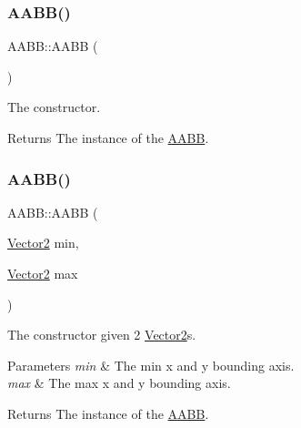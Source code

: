 \mbox{\label{class_a_a_b_b_a5f5baf6c533905aa1456b3a3eb57bab2}} 
\subsubsection{\texorpdfstring{AABB()}{AABB()}\hspace{0.1cm}{\footnotesize\ttfamily [1/3]}}
{\footnotesize\ttfamily A\+A\+B\+B\+::\+A\+A\+BB (\begin{DoxyParamCaption}{ }\end{DoxyParamCaption})}



The constructor. 

\begin{DoxyReturn}{Returns}
The instance of the \mbox{\hyperlink{class_a_a_b_b}{A\+A\+BB}}. 
\end{DoxyReturn}
\mbox{\label{class_a_a_b_b_adf4f9cc4708df46e3c791ecb66ab2850}} 
\subsubsection{\texorpdfstring{AABB()}{AABB()}\hspace{0.1cm}{\footnotesize\ttfamily [2/3]}}
{\footnotesize\ttfamily A\+A\+B\+B\+::\+A\+A\+BB (\begin{DoxyParamCaption}\item[{\mbox{\hyperlink{struct_vector2}{Vector2}}}]{min,  }\item[{\mbox{\hyperlink{struct_vector2}{Vector2}}}]{max }\end{DoxyParamCaption})}



The constructor given 2 \mbox{\hyperlink{struct_vector2}{Vector2}}\textquotesingle{}s. 


\begin{DoxyParams}{Parameters}
{\em min} & The min x and y bounding axis. \\
\hline
{\em max} & The max x and y bounding axis. \\
\hline
\end{DoxyParams}
\begin{DoxyReturn}{Returns}
The instance of the \mbox{\hyperlink{class_a_a_b_b}{A\+A\+BB}}. 
\end{DoxyReturn}
\mbox{\label{class_a_a_b_b_ac5d91f2d365a1a54f20106dec77f0cc9}} 
